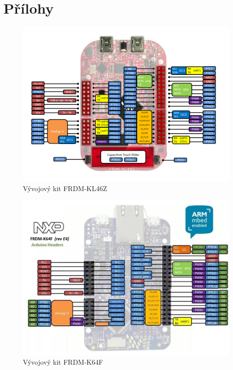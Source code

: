 \documentclass[a4paper]{article}
\begin{document}
\newpage
\section*{Přílohy}

\begin{figure}[h]
	\includegraphics[width=\textwidth]{frdm-kl46z-pins-description.png}
	\caption{Vývojový kit FRDM-KL46Z}
	\label{frdm-kl46z-pins-description}
\end{figure}

\begin{figure}[h]
	\includegraphics[width=\textwidth]{frdm-k64f-pins-description.jpg}
	\caption{Vývojový kit FRDM-K64F}
	\label{frdm-k64f-pins-description}
\end{figure}
\end{document}
